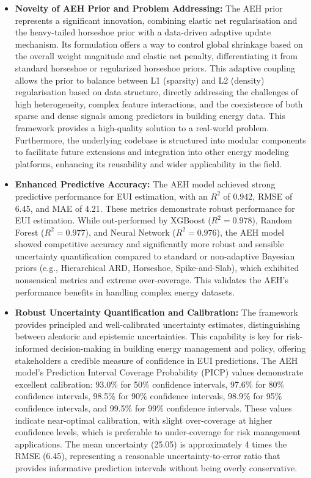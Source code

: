 \begin{itemize}
\item \textbf{Novelty of AEH Prior and Problem Addressing:} The AEH prior represents a significant innovation, combining elastic net regularisation and the heavy-tailed horseshoe prior with a data-driven adaptive update mechanism. Its formulation offers a way to control global shrinkage based on the overall weight magnitude and elastic net penalty, differentiating it from standard horseshoe or regularized horseshoe priors. This adaptive coupling allows the prior to balance between L1 (sparsity) and L2 (density) regularisation based on data structure, directly addressing the challenges of high heterogeneity, complex feature interactions, and the coexistence of both sparse and dense signals among predictors in building energy data. This framework provides a high-quality solution to a real-world problem. Furthermore, the underlying codebase is structured into modular components to facilitate future extensions and integration into other energy modeling platforms, enhancing its reusability and wider applicability in the field.

\item \textbf{Enhanced Predictive Accuracy:} The AEH model achieved strong predictive performance for EUI estimation, with an $R^{2}$ of 0.942, RMSE of 6.45, and MAE of 4.21. These metrics demonstrate robust performance for EUI estimation. While out-performed by XGBoost ($R^{2}=0.978$), Random Forest ($R^{2}=0.977$), and Neural Network ($R^{2}=0.976$), the AEH model showed competitive accuracy and significantly more robust and sensible uncertainty quantification compared to standard or non-adaptive Bayesian priors (e.g., Hierarchical ARD, Horseshoe, Spike-and-Slab), which exhibited nonsensical metrics and extreme over-coverage. This validates the AEH's performance benefits in handling complex energy datasets.

\item \textbf{Robust Uncertainty Quantification and Calibration:} The framework provides principled and well-calibrated uncertainty estimates, distinguishing between aleatoric and epistemic uncertainties. This capability is key for risk-informed decision-making in building energy management and policy, offering stakeholders a credible measure of confidence in EUI predictions. The AEH model's Prediction Interval Coverage Probability (PICP) values demonstrate excellent calibration: 93.0\% for 50\% confidence intervals, 97.6\% for 80\% confidence intervals, 98.5\% for 90\% confidence intervals, 98.9\% for 95\% confidence intervals, and 99.5\% for 99\% confidence intervals. These values indicate near-optimal calibration, with slight over-coverage at higher confidence levels, which is preferable to under-coverage for risk management applications. The mean uncertainty (25.05) is approximately 4 times the RMSE (6.45), representing a reasonable uncertainty-to-error ratio that provides informative prediction intervals without being overly conservative.


\end{itemize}
